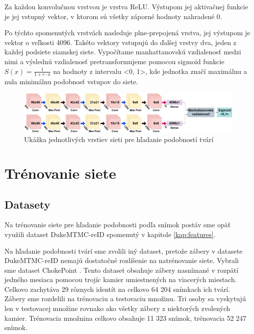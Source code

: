 Za každou konvolučnou vrstvou je vrstva ReLU. 
Výstupom jej aktivačnej funkcie je jej vstupný vektor, v ktorom sú všetky záporné hodnoty nahradené 0.

Po týchto spomenutých vrstvách nasleduje plne-prepojená vrstva, jej výstupom je vektor o veľkosti 4096.
Takéto vektory vstupujú do ďalšej vrstvy dva, jeden z každej podsiete siamskej siete.
Vypočítame manhattanovskú vzdialenosť medzi nimi a výslednú vzdialenosť pretransformujeme pomocou sigmoid funkcie $S(x) = \frac{1}{1 + e^-x}$ na hodnoty z intervalu <0, 1>, 
kde jednotka značí maximálnu a nula minimálnu podobnosť vstupov do siete.

\begin{figure}[H]
\centerline{\includegraphics[width=1\textwidth]{images/siamese_architecture}}
\caption[Architektúra siete pre hľadanie podobností tvárí]{Ukážka jednotlivých vrstiev sieti pre hľadanie podobností tvárí}
\label{obr:siamese_architecture}
\end{figure}

\section{Trénovanie siete} \label{kap:siamese_train}
\subsection{Datasety}
Na trénovanie siete pre hľadanie podobnosti podľa snímok postáv sme opäť využili dataset DukeMTMC-reID \cite{ristani2016MTMC} \cite{zheng2017unlabeled} spomenutý v kapitole \ref{kap:features}.

Na hľadanie podobnosti tvárí sme zvolili iný dataset, pretože zábery v datasete DukeMTMC-reID nemajú dostatočné rozlíšenie na natrénovanie siete.
Vybrali sme dataset ChokePoint \cite{wong_cvprw_2011}. 
Tento dataset obsahuje zábery nasnímané v rozpätí jedného mesiaca pomocou trojíc kamier umiestnených na viacerých miestach.
Celkovo zachytáva 29 rôznych identít na celkovo 64 204 snímkach ich tvárí.
Zábery sme rozdelili na trénovaciu a testovaciu množinu.
Tri osoby sa vyskytujú len v testovacej množine rovnako ako všetky zábery z niektorých zvolených kamier.
Trénovacia množnina celkovo obsahuje 11 323 snímok, trénovacia 52 247 snímok.

